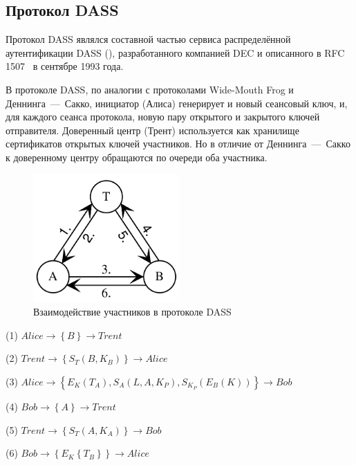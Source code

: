 \subsection{Протокол DASS}

Протокол DASS являлся составной частью сервиса распределённой аутентификации DASS (), разработанного компанией DEC и описанного в RFC 1507~\cite{rfc1507} в сентябре 1993 года.

В протоколе DASS, по аналогии с протоколами Wide-Mouth Frog и Деннинга~---~Сакко, инициатор (Алиса) генерирует и новый сеансовый ключ, и, для каждого сеанса протокола, новую пару открытого и закрытого ключей отправителя. Доверенный центр (Трент) используется как хранилище сертификатов открытых ключей участников. Но в отличие от Деннинга~---~Сакко к доверенному центру обращаются по очереди оба участника.

\begin{figure}
    \centering
    \includegraphics[width=0.5\textwidth]{pic/key_distribution-dass}
    \caption{Взаимодействие участников в протоколе DASS\label{fig:key_distribution-dass}}
\end{figure}

\begin{protocol}
    \item[(1)] $Alice \to \left\{ B \right\} \to Trent$
    \item[(2)] $Trent \to \left\{ S_T \left( B, K_B \right) \right\} \to Alice$
    \item[(3)] $Alice \to \left\{ E_K \left( T_A \right), S_A \left( L, A, K_P \right), S_{K_P} \left( E_B \left( K \right) \right) \right\} \to Bob$
    \item[(4)] $Bob \to \left\{ A \right\} \to Trent$
    \item[(5)] $Trent \to \left\{ S_T \left( A, K_A \right) \right\} \to Bob$
    \item[(6)] $Bob \to \left\{ E_K \left\{ T_B \right\} \right\} \to Alice$
\end{protocol}

